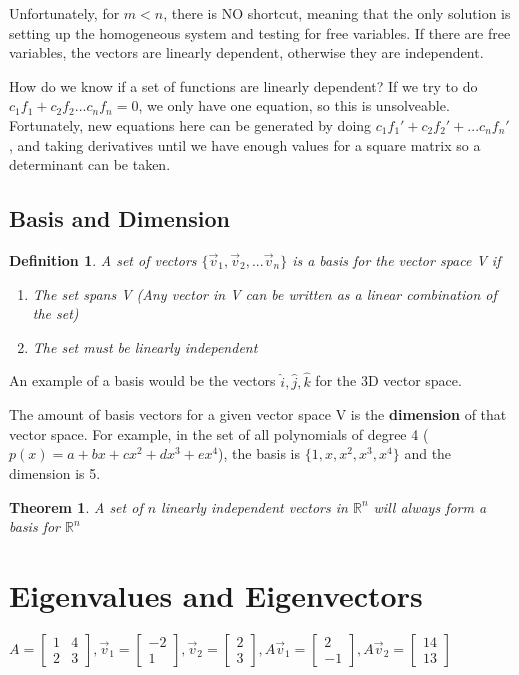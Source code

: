 \documentclass{article}
\newtheorem{definition}{Definition}
\newtheorem{theorem}{Theorem}
\begin{document}
Unfortunately, for $m<n$, there is NO shortcut, meaning that the only solution is setting up the homogeneous system and testing
for free variables. If there are free variables, the vectors are linearly dependent, otherwise they are independent.

How do we know if a set of functions are linearly dependent? If we try to do $c_1f_1+c_2f_2...c_nf_n=0$, we only have one equation, so
this is unsolveable. Fortunately, new equations here can be generated by doing $c_1f_1'+c_2f_2'+...c_nf_n'$, and taking derivatives
until we have enough values for a square matrix so a determinant can be taken. 

\subsection{Basis and Dimension}

\begin{definition} A set of vectors $\{\vec{v}_1, \vec{v}_2, ... \vec{v}_n\}$ is a basis for the vector space V if
	\begin{enumerate}
		\item The set spans V (Any vector in V can be written as a linear combination of the set)
		\item The set must be linearly independent
	\end{enumerate}
\end{definition}

An example of a basis would be the vectors $\hat{i}, \hat{j}, \hat{k}$ for the 3D vector space.

The amount of basis vectors for a given vector space V is the \textbf{dimension} of that vector space. For example, in the set of
all polynomials of degree 4 ($p(x)=a+bx+cx^2+dx^3+ex^4$), the basis is $\{1,x,x^2,x^3,x^4\}$ and the dimension is 5.

\begin{theorem}
	A set of $n$ linearly independent vectors in $\mathbb{R}^n$ will always form a basis for $\mathbb{R}^n$
\end{theorem}

\section{Eigenvalues and Eigenvectors}

$A=\begin{bmatrix}1&4\\2&3\end{bmatrix}, \vec{v}_1=\begin{bmatrix}-2\\1\end{bmatrix},\vec{v}_2=\begin{bmatrix}2\\3\end{bmatrix},
A\vec{v}_1=\begin{bmatrix}2\\-1\end{bmatrix}, A\vec{v}_2=\begin{bmatrix}14\\13\end{bmatrix}$
\end{document}
